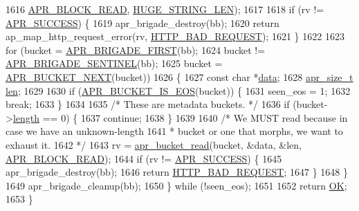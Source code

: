 \begin{DoxyCode}
1616                             \hyperlink{group__APR__Util__Bucket__Brigades_gga756973fb6392bd1026c3d96b4519776da2d983f5b7fd996434e0dded171c261d8}{APR\_BLOCK\_READ}, \hyperlink{group__APACHE__CORE__DAEMON_ga0c9dd98f46b90b5bcd4cbf75e252d0da}{HUGE\_STRING\_LEN});
1617 
1618         \textcolor{keywordflow}{if} (rv != \hyperlink{group__apr__errno_ga9ee311b7bf1c691dc521d721339ee2a6}{APR\_SUCCESS}) \{
1619             apr\_brigade\_destroy(bb);
1620             \textcolor{keywordflow}{return} ap\_map\_http\_request\_error(rv, \hyperlink{group__HTTP__Status_ga0c1fdbbb10800664989907cbd3a5a023}{HTTP\_BAD\_REQUEST});
1621         \}
1622 
1623         \textcolor{keywordflow}{for} (bucket = \hyperlink{group__APR__Util__Bucket__Brigades_gab5826a11eb6ba90786a94282f806c230}{APR\_BRIGADE\_FIRST}(bb);
1624              bucket != \hyperlink{group__APR__Util__Bucket__Brigades_ga858da66dccab1e063415678bb115788a}{APR\_BRIGADE\_SENTINEL}(bb);
1625              bucket = \hyperlink{group__APR__Util__Bucket__Brigades_ga7171f690b203d548a5b6ae0b079068d8}{APR\_BUCKET\_NEXT}(bucket))
1626         \{
1627             \textcolor{keyword}{const} \textcolor{keywordtype}{char} *\hyperlink{group__APACHE__CORE__LOG_gae4950db1dbfff8459a712737063b61aa}{data};
1628             \hyperlink{group__apr__platform_gaaa72b2253f6f3032cefea5712a27540e}{apr\_size\_t} \hyperlink{group__APACHE__CORE__LOG_gab5a43233d60ef05c5b5bf5cba3d74468}{len};
1629 
1630             \textcolor{keywordflow}{if} (\hyperlink{group__APR__Util__Bucket__Brigades_ga89b225e1c08473766eec719b985ca0d6}{APR\_BUCKET\_IS\_EOS}(bucket)) \{
1631                 seen\_eos = 1;
1632                 \textcolor{keywordflow}{break};
1633             \}
1634 
1635             \textcolor{comment}{/* These are metadata buckets. */}
1636             \textcolor{keywordflow}{if} (bucket->\hyperlink{structapr__bucket_a0898dfc78d9275187189b9a745e619bf}{length} == 0) \{
1637                 \textcolor{keywordflow}{continue};
1638             \}
1639 
1640             \textcolor{comment}{/* We MUST read because in case we have an unknown-length}
1641 \textcolor{comment}{             * bucket or one that morphs, we want to exhaust it.}
1642 \textcolor{comment}{             */}
1643             rv = \hyperlink{group__APR__Util__Bucket__Brigades_gae44ae938c6c60e148430fdb098dcf28f}{apr\_bucket\_read}(bucket, &data, &len, 
      \hyperlink{group__APR__Util__Bucket__Brigades_gga756973fb6392bd1026c3d96b4519776da2d983f5b7fd996434e0dded171c261d8}{APR\_BLOCK\_READ});
1644             \textcolor{keywordflow}{if} (rv != \hyperlink{group__apr__errno_ga9ee311b7bf1c691dc521d721339ee2a6}{APR\_SUCCESS}) \{
1645                 apr\_brigade\_destroy(bb);
1646                 \textcolor{keywordflow}{return} \hyperlink{group__HTTP__Status_ga0c1fdbbb10800664989907cbd3a5a023}{HTTP\_BAD\_REQUEST};
1647             \}
1648         \}
1649         apr\_brigade\_cleanup(bb);
1650     \} \textcolor{keywordflow}{while} (!seen\_eos);
1651 
1652     \textcolor{keywordflow}{return} \hyperlink{group__APACHE__CORE__DAEMON_gaba51915c87d64af47fb1cc59348961c9}{OK};
1653 \}
\end{DoxyCode}
